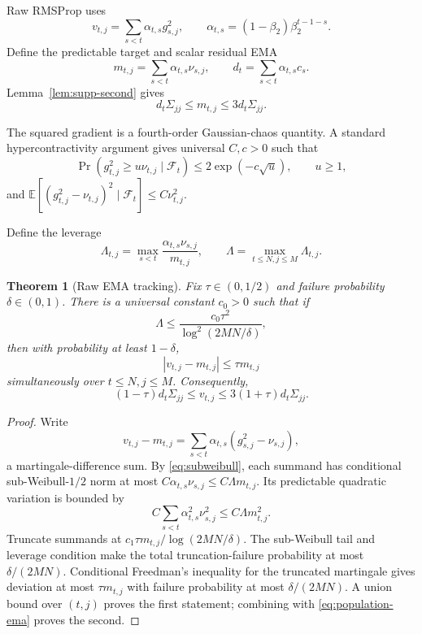 \documentclass[letterpaper]{article}
\newtheorem{theorem}{Theorem}
\newcommand{\E}{\mathbb{E}}
\begin{document}
Raw RMSProp uses
\[
 v_{t,j}=\sum_{s<t}\alpha_{t,s}g_{s,j}^2,
 \qquad \alpha_{t,s}=(1-\beta_2)\beta_2^{t-1-s}.
\]
Define the predictable target and scalar residual EMA
\[
 m_{t,j}=\sum_{s<t}\alpha_{t,s}\nu_{s,j},
 \qquad
 d_t=\sum_{s<t}\alpha_{t,s}c_s.
\]
Lemma~\ref{lem:supp-second} gives
\begin{equation}
\label{eq:population-ema}
 d_t\Sigma_{jj}\le m_{t,j}\le3d_t\Sigma_{jj}.
\end{equation}

The squared gradient is a fourth-order Gaussian-chaos quantity.  A standard hypercontractivity argument gives universal $C,c>0$ such that
\begin{equation}
\label{eq:subweibull}
 \Pr(g_{t,j}^2\ge u\nu_{t,j}\mid\mathcal F_t)
 \le2\exp(-c\sqrt{u}),\qquad u\ge1,
\end{equation}
and $\E[(g_{t,j}^2-\nu_{t,j})^2\mid\mathcal F_t]\le C\nu_{t,j}^2$.

Define the leverage
\[
 \Lambda_{t,j}=\max_{s<t}\frac{\alpha_{t,s}\nu_{s,j}}{m_{t,j}},
 \qquad \Lambda=\max_{t\le N,j\le M}\Lambda_{t,j}.
\]

\begin{theorem}[Raw EMA tracking]
\label{thm:raw-ema}
Fix $\tau\in(0,1/2)$ and failure probability $\delta\in(0,1)$.  There is a universal constant $c_0>0$ such that if
\[
 \Lambda\le \frac{c_0\tau^2}{\log^2(2MN/\delta)},
\]
then with probability at least $1-\delta$,
\[
 |v_{t,j}-m_{t,j}|\le\tau m_{t,j}
\]
simultaneously over $t\le N,j\le M$.  Consequently,
\[
 (1-\tau)d_t\Sigma_{jj}
 \le v_{t,j}
 \le3(1+\tau)d_t\Sigma_{jj}.
\]
\end{theorem}

\begin{proof}
Write
\[
 v_{t,j}-m_{t,j}=\sum_{s<t}\alpha_{t,s}(g_{s,j}^2-\nu_{s,j}),
\]
a martingale-difference sum.  By \eqref{eq:subweibull}, each summand has conditional sub-Weibull-$1/2$ norm at most $C\alpha_{t,s}\nu_{s,j}\le C\Lambda m_{t,j}$.  Its predictable quadratic variation is bounded by
\[
 C\sum_{s<t}\alpha_{t,s}^2\nu_{s,j}^2
 \le C\Lambda m_{t,j}^2.
\]
Truncate summands at $c_1\tau m_{t,j}/\log(2MN/\delta)$.  The sub-Weibull tail and leverage condition make the total truncation-failure probability at most $\delta/(2MN)$.  Conditional Freedman's inequality for the truncated martingale gives deviation at most $\tau m_{t,j}$ with failure probability at most $\delta/(2MN)$.  A union bound over $(t,j)$ proves the first statement; combining with \eqref{eq:population-ema} proves the second.
\end{proof}
\end{document}
